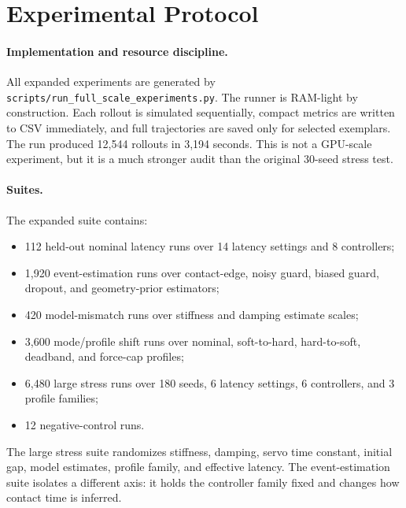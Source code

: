 \documentclass{article}
\begin{document}
\begin{table}[t]
    \centering
    \caption{Tuned delayed-feedback baseline hyperparameters selected on the training grid before held-out evaluation. Higher cautious and gain-schedule values slow or attenuate the delayed controller more aggressively; the low-pass value is the filter update weight.}
    \label{tab:tuned}
    
\end{table}

\section{Experimental Protocol}

\paragraph{Implementation and resource discipline.}
All expanded experiments are generated by \texttt{scripts/run\_full\_scale\_experiments.py}. The runner is RAM-light by construction. Each rollout is simulated sequentially, compact metrics are written to CSV immediately, and full trajectories are saved only for selected exemplars. The run produced 12,544 rollouts in 3,194 seconds. This is not a GPU-scale experiment, but it is a much stronger audit than the original 30-seed stress test.

\paragraph{Suites.}
The expanded suite contains:
\begin{itemize}
    \item 112 held-out nominal latency runs over 14 latency settings and 8 controllers;
    \item 1,920 event-estimation runs over contact-edge, noisy guard, biased guard, dropout, and geometry-prior estimators;
    \item 420 model-mismatch runs over stiffness and damping estimate scales;
    \item 3,600 mode/profile shift runs over nominal, soft-to-hard, hard-to-soft, deadband, and force-cap profiles;
    \item 6,480 large stress runs over 180 seeds, 6 latency settings, 6 controllers, and 3 profile families;
    \item 12 negative-control runs.
\end{itemize}
The large stress suite randomizes stiffness, damping, servo time constant, initial gap, model estimates, profile family, and effective latency. The event-estimation suite isolates a different axis: it holds the controller family fixed and changes how contact time is inferred.
\end{document}
